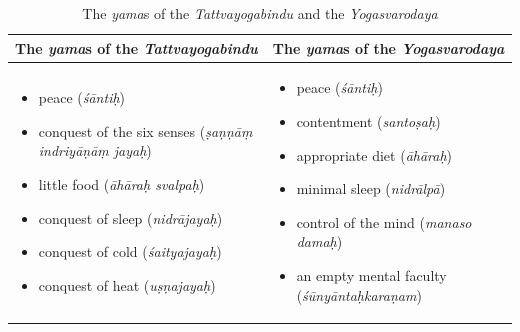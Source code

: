 \footnotesize
\begin{table}[!htb]
    \footnotesize
\centering
\begin{tabular}{|m{5cm}|m{5cm}|}
\hline
\textbf{The \textit{yama}s of the \textit{Tattvayogabindu}} & \textbf{The \textit{yama}s of the \textit{Yogasvarodaya}} \\
\hline
\begin{itemize}
\item peace (\textit{śāntiḥ})
\item conquest of the six senses (\textit{ṣaṇṇāṃ indriyāṇāṃ jayaḥ})
\item little food (\textit{āhāraḥ svalpaḥ})
\item conquest of sleep (\textit{nidrājayaḥ})
\item conquest of cold (\textit{śaityajayaḥ})
\item conquest of heat (\textit{uṣṇajayaḥ})
\end{itemize}
&
\begin{itemize}
\item peace (\textit{śāntiḥ})
\item contentment (\textit{santoṣaḥ})
\item appropriate diet (\textit{āhāraḥ})
\item minimal sleep (\textit{nidrālpā})
\item control of the mind (\textit{manaso damaḥ})
\item an empty mental faculty (\textit{śūnyāntaḥkaraṇam})
\end{itemize}
\\
\hline
\end{tabular}
\caption{The \textit{yama}s of the \textit{Tattvayogabindu} and the \textit{Yogasvarodaya}}
\label{tab-yama}
\normalsize
\end{table}

